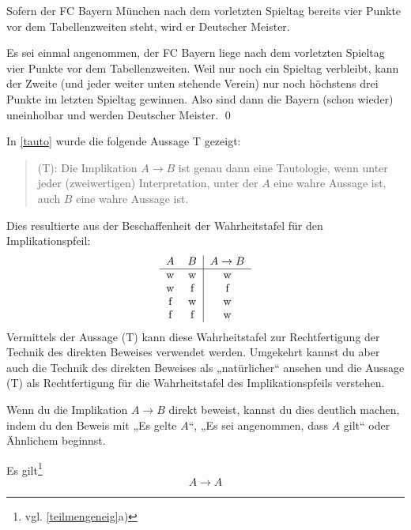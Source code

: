 \begin{bsp}
    Sofern der FC Bayern München nach dem vorletzten Spieltag bereits vier Punkte vor dem Tabellenzweiten steht, wird er Deutscher Meister.
\end{bsp}


\begin{bew}
    Es sei einmal angenommen, der FC Bayern liege nach dem vorletzten Spieltag vier Punkte vor dem Tabellenzweiten. Weil nur noch ein Spieltag verbleibt, kann der Zweite (und jeder weiter unten stehende Verein) nur noch höchstens drei Punkte im letzten Spieltag gewinnen. Also sind dann die Bayern (schon wieder) uneinholbar und werden Deutscher Meister. \qed
\end{bew}


\begin{bem}
    In \cref{tauto} wurde die folgende Aussage T gezeigt:
    \begin{quote}
        (T): Die Implikation $A\to B$ ist genau dann eine Tautologie, wenn unter jeder (zweiwertigen) Interpretation, unter der $A$ eine wahre Aussage ist, auch $B$ eine wahre Aussage ist.
    \end{quote}
    Dies resultierte aus der Beschaffenheit der Wahrheitstafel für den Implikationspfeil:
    \[\begin{tabular}{cc|c}
        $A$ & $B$ & $A\to B$ \\
        \hline
        w & w & w \\
        w & f & f \\
        f & w & w \\
        f & f & w
    \end{tabular}\]
    Vermittels der Aussage (T) kann diese Wahrheitstafel zur Rechtfertigung der Technik des direkten Beweises verwendet werden. Umgekehrt kannst du aber auch die Technik des direkten Beweises als „natürlicher“ ansehen und die Aussage (T) als Rechtfertigung für die Wahrheitstafel des Implikationspfeils verstehen.
\end{bem}
  
  
\begin{bem}[Signalwörter]
    Wenn du die Implikation $A\to B$ direkt beweist, kannst du dies deutlich machen, indem du den Beweis mit „Es gelte $A$“, „Es sei angenommen, dass $A$ gilt“ oder Ähnlichem beginnst.
\end{bem}

  
\begin{satz} \label{implikationref}
    Es gilt\footnote{vgl. \cref{teilmengeneig}a)}
    \[ A\to A \]
\end{satz}



